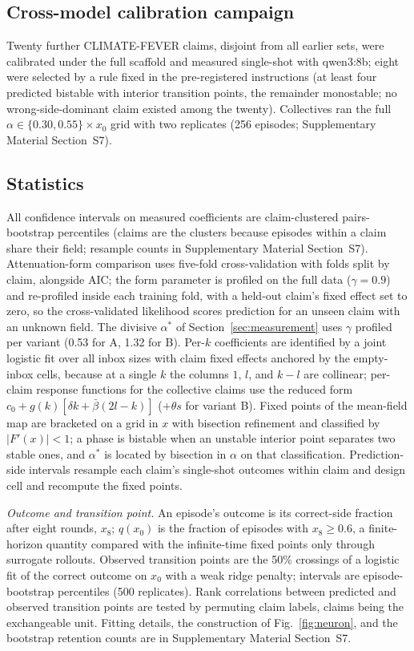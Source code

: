 \documentclass{ieeeaccess}
\newcommand{\astar}{\alpha^{*}}
\begin{document}
\subsection{Cross-model calibration campaign}

Twenty further CLIMATE-FEVER claims, disjoint from all earlier sets, were
calibrated under the full scaffold and measured single-shot with qwen3:8b;
eight were selected by a rule fixed in the pre-registered instructions (at least four predicted bistable with interior transition points, the remainder
monostable; no wrong-side-dominant claim existed among the twenty).
Collectives ran the full $\alpha \in \{0.30, 0.55\} \times x_0$ grid with two
replicates (256 episodes; Supplementary Material Section~S7).

\subsection{Statistics}

All confidence intervals on measured coefficients are claim-clustered
pairs-bootstrap percentiles (claims are the clusters because episodes within
a claim share their field; resample counts in Supplementary Material Section~S7).
Attenuation-form comparison uses five-fold cross-validation with folds split
by claim, alongside AIC; the form parameter is profiled on the full data
($\gamma = 0.9$) and re-profiled inside each training fold, with a held-out
claim's fixed effect set to zero, so the cross-validated likelihood scores
prediction for an unseen claim with an unknown field. The divisive $\astar$
of Section~\ref{sec:measurement} uses $\gamma$ profiled per variant (0.53 for
A, 1.32 for B). Per-$k$ coefficients are identified by a joint logistic fit
over all inbox sizes with claim fixed effects anchored by the empty-inbox
cells, because at a single $k$ the columns $1$, $l$, and $k - l$ are
collinear; per-claim response functions for the collective claims use the
reduced form $c_0 + g(k)[\delta k + \bar\beta(2l - k)]$ ($+\theta s$ for
variant B). Fixed points of the mean-field map are bracketed on a grid in $x$
with bisection refinement and classified by $|F'(x)| < 1$; a phase is
bistable when an unstable interior point separates two stable ones, and
$\astar$ is located by bisection in $\alpha$ on that classification.
Prediction-side intervals resample each claim's single-shot outcomes within
claim and design cell and recompute the fixed points.

\emph{Outcome and transition point.} An episode's outcome is its correct-side
fraction after eight rounds, $x_8$; $q(x_0)$ is the fraction of episodes with
$x_8 \ge 0.6$, a finite-horizon quantity compared with the infinite-time
fixed points only through surrogate rollouts. Observed transition points are the 50\% crossings of a logistic fit of the correct outcome on $x_0$ with a weak
ridge penalty; intervals are episode-bootstrap percentiles (500 replicates).
Rank correlations between predicted and observed transition points are tested by
permuting claim labels, claims being the exchangeable unit. Fitting details,
the construction of Fig.~\ref{fig:neuron}, and the bootstrap retention counts are in Supplementary Material Section~S7.
\end{document}
